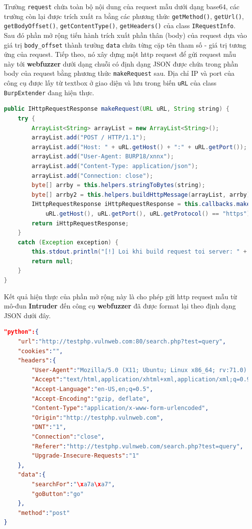 Trường \texttt{request} chứa toàn bộ nội dung của request mẫu dưới dạng base64, các trường còn lại được trích xuất ra bằng các phương thức \texttt{getMethod()}, \texttt{getUrl()}, \texttt{getBodyOffset()}, \texttt{getContentType()}, \texttt{getHeaders()} của class \texttt{IRequestInfo}. Sau đó phần mở rộng tiến hành trích xuất phần thân (body) của request dựa vào giá trị \texttt{body\_offset} thành trường \texttt{data} chứa từng cặp tên tham số - giá trị tương ứng của request. Tiếp theo, nó xây dựng một \acrshort{http} request để gửi request mẫu này tới \textbf{webfuzzer} dưới dạng chuỗi có định dạng JSON được chứa trong phần body của request bằng phương thức \texttt{makeRequest} sau. Địa chỉ IP và port của công cụ được lấy từ textbox ở giao diện và lưu trong biến \texttt{uRL} của class \texttt{BurpExtender} đang hiện thực.\\
\begin{lstlisting}[language=Java]
public IHttpRequestResponse makeRequest(URL uRL, String string) {
    try {
        ArrayList<String> arrayList = new ArrayList<String>();
        arrayList.add("POST / HTTP/1.1");
        arrayList.add("Host: " + uRL.getHost() + ":" + uRL.getPort());
        arrayList.add("User-Agent: BURP18/xnnx");
        arrayList.add("Content-Type: application/json");
        arrayList.add("Connection: close");
        byte[] arrby = this.helpers.stringToBytes(string);
        byte[] arrby2 = this.helpers.buildHttpMessage(arrayList, arrby);
        IHttpRequestResponse iHttpRequestResponse = this.callbacks.makeHttpRequest(this.helpers.buildHttpService(
            uRL.getHost(), uRL.getPort(), uRL.getProtocol() == "https"), arrby2);
        return iHttpRequestResponse;
    }
    catch (Exception exception) {
        this.stdout.println("[!] Loi khi build request toi server: " + exception.getMessage());
        return null;
    }
}
\end{lstlisting}
Kết quả hiện thực của phần mở rộng này là cho phép gửi \acrshort{http} request mẫu từ mô-đun \textbf{Intruder} đến công cụ \textbf{webfuzzer} đã được format lại theo định dạng JSON dưới đây.\\
\begin{lstlisting}[language=json,firstnumber=1]
"python":{ 
    "url":"http://testphp.vulnweb.com:80/search.php?test=query",
    "cookies":"",
    "headers":{ 
        "User-Agent":"Mozilla/5.0 (X11; Ubuntu; Linux x86_64; rv:71.0) Gecko/20100101 Firefox/71.0",
        "Accept":"text/html,application/xhtml+xml,application/xml;q=0.9,*/*;q=0.8",
        "Accept-Language":"en-US,en;q=0.5",
        "Accept-Encoding":"gzip, deflate",
        "Content-Type":"application/x-www-form-urlencoded",
        "Origin":"http://testphp.vulnweb.com",
        "DNT":"1",
        "Connection":"close",
        "Referer":"http://testphp.vulnweb.com/search.php?test=query",
        "Upgrade-Insecure-Requests":"1"
    },
    "data":{ 
        "searchFor":"\xa7a\xa7",
        "goButton":"go"
    },
    "method":"post"
}
\end{lstlisting}
